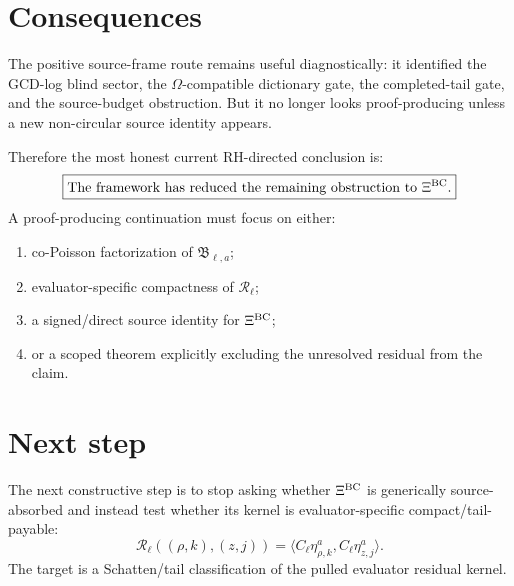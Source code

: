 \documentclass[11pt]{article}
\newcommand{\XiBC}{\Xi^{\rm BC}}
\newcommand{\Bell}{\mathfrak B_{\ell,a}}
\newcommand{\Cell}{C_\ell}
\begin{document}
\section{Consequences}
The positive source-frame route remains useful diagnostically: it identified the GCD-log blind sector, the $\Omega$-compatible dictionary gate, the completed-tail gate, and the source-budget obstruction.  But it no longer looks proof-producing unless a new non-circular source identity appears.

Therefore the most honest current RH-directed conclusion is:
\[
  \boxed{\text{The framework has reduced the remaining obstruction to }\XiBC.}
\]
A proof-producing continuation must focus on either:
\begin{enumerate}[label=(\arabic*)]
  \item co-Poisson factorization of $\Bell$;
  \item evaluator-specific compactness of $\mathcal R_\ell$;
  \item a signed/direct source identity for $\XiBC$;
  \item or a scoped theorem explicitly excluding the unresolved residual from the claim.
\end{enumerate}

\section{Next step}
The next constructive step is to stop asking whether $\XiBC$ is generically source-absorbed and instead test whether its kernel is evaluator-specific compact/tail-payable:
\[
  \boxed{\mathcal R_\ell((\rho,k),(z,j))
  =\langle \Cell\eta^a_{\rho,k},\Cell\eta^a_{z,j}\rangle.}
\]
The target is a Schatten/tail classification of the pulled evaluator residual kernel.
\end{document}
